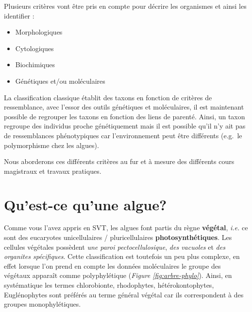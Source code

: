 \documentclass[
]{book}
\providecommand{\tightlist}{%
  \setlength{\itemsep}{0pt}\setlength{\parskip}{0pt}}
\begin{document}
Plusieurs critères vont être pris en compte pour décrire les organismes et ainsi les identifier :

\begin{itemize}
\tightlist
\item
  Morphologiques
\item
  Cytologiques
\item
  Biochimiques
\item
  Génétiques et/ou moléculaires
\end{itemize}

La classification classique établit des taxons en fonction de critères de ressemblance, avec l'essor des outils génétiques et moléculaires, il est maintenant possible de regrouper les taxons en fonction des liens de parenté. Ainsi, un taxon regroupe des individus proche génétiquement mais il est possible qu'il n'y ait pas de ressemblances phénotypiques car l'environnement peut être différents (e.g.~le polymorphisme chez les algues).

Nous aborderons ces différents critères au fur et à mesure des différents cours magistraux et travaux pratiques.

\hypertarget{quest-ce-quune-algue}{%
\section{Qu'est-ce qu'une algue?}\label{quest-ce-quune-algue}}

Comme vous l'avez appris en SVT, les algues font partis du règne \textbf{végétal}, \emph{i.e.} ce sont des eucaryotes unicellulaires / pluricellulaires \textbf{photosynthétiques}. Les cellules végétales possèdent \emph{une paroi pectocellulosique}, \emph{des vacuoles} et \emph{des organites spécifiques}. Cette classification est toutefois un peu plus complexe, en effet lorsque l'on prend en compte les données moléculaires le groupe des végétaux apparaît comme polyphylétique (\emph{Figure \ref{fig:arbre-phylo}}). Ainsi, en systématique les termes chlorobionte, rhodophytes, hétérokontophytes, Euglénophytes sont préférés au terme général végétal car ils correspondent à des groupes monophylétiques.
\end{document}
